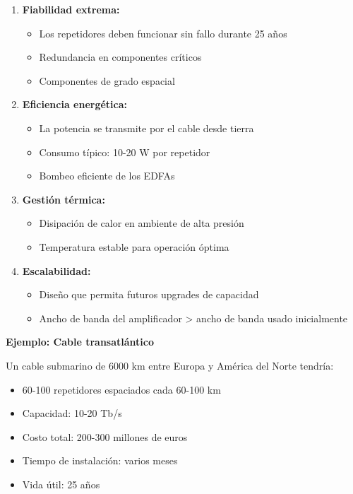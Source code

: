 \documentclass[11pt,a4paper]{article}
\begin{document}
\begin{enumerate}
    \item \textbf{Fiabilidad extrema:}
    \begin{itemize}
        \item Los repetidores deben funcionar sin fallo durante 25 años
        \item Redundancia en componentes críticos
        \item Componentes de grado espacial
    \end{itemize}
    
    \item \textbf{Eficiencia energética:}
    \begin{itemize}
        \item La potencia se transmite por el cable desde tierra
        \item Consumo típico: 10-20 W por repetidor
        \item Bombeo eficiente de los EDFAs
    \end{itemize}
    
    \item \textbf{Gestión térmica:}
    \begin{itemize}
        \item Disipación de calor en ambiente de alta presión
        \item Temperatura estable para operación óptima
    \end{itemize}
    
    \item \textbf{Escalabilidad:}
    \begin{itemize}
        \item Diseño que permita futuros upgrades de capacidad
        \item Ancho de banda del amplificador > ancho de banda usado inicialmente
    \end{itemize}
\end{enumerate}

\textbf{Ejemplo: Cable transatlántico}

Un cable submarino de 6000 km entre Europa y América del Norte tendría:
\begin{itemize}
    \item 60-100 repetidores espaciados cada 60-100 km
    \item Capacidad: 10-20 Tb/s
    \item Costo total: 200-300 millones de euros
    \item Tiempo de instalación: varios meses
    \item Vida útil: 25 años
\end{itemize}
\end{document}
